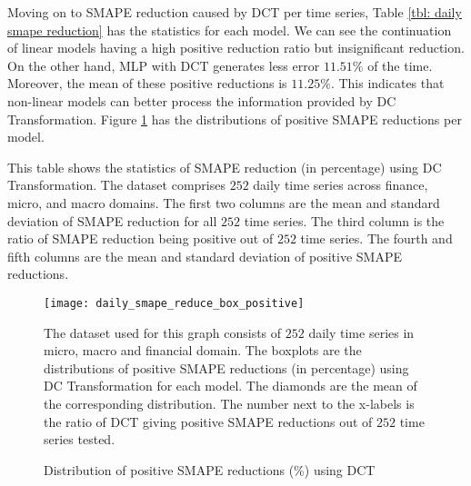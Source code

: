 Moving on to SMAPE reduction caused by DCT per time series, Table \ref{tbl: daily smape reduction} has the statistics for each model. We can see the continuation of linear models having a high positive reduction ratio but insignificant reduction. On the other hand, MLP with DCT generates less error $11.51\%$ of the time. Moreover, the mean of these positive reductions is $11.25\%$. This indicates that non-linear models can better process the information provided by DC Transformation. Figure \ref{fig: daily positive smape reduce box} has the distributions of positive SMAPE reductions per model.
\begin{table}[H]
    \caption{Statistics of SMAPE reduction (\%) using DCT (daily cross-domain)}
    {\raggedright \footnotesize This table shows the statistics of SMAPE reduction (in percentage) using DC Transformation. The dataset comprises $252$ daily time series across finance, micro, and macro domains. The first two columns are the mean and standard deviation of SMAPE reduction for all $252$ time series. The third column is the ratio of SMAPE reduction being positive out of $252$ time series. The fourth and fifth columns are the mean and standard deviation of positive SMAPE reductions. \par}
    \label{tbl: daily smape reduction}
\end{table}
\begin{figure}[H]
    \centering
    \texttt{[image: daily\_smape\_reduce\_box\_positive]}
    \caption{Distribution of positive SMAPE reductions (\%) using DCT}
    {\raggedright \footnotesize The dataset used for this graph consists of $252$ daily time series in micro, macro and financial domain. The boxplots are the distributions of positive SMAPE reductions (in percentage) using DC Transformation for each model. The diamonds are the mean of the corresponding distribution. The number next to the x-labels is the ratio of DCT giving positive SMAPE reductions out of $252$ time series tested.\par}
    \label{fig: daily positive smape reduce box}
\end{figure}
